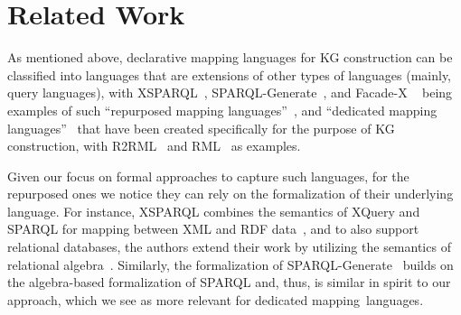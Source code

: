 \vspace{-2mm} %
\enlargethispage{\baselineskip}%

\section{Related Work}%
\label{sec:related_works}

\vspace{-2mm} %

As mentioned above, declarative mapping languages for KG construction can be classified into languages that are extensions of other types of languages (mainly, query languages), with XSPARQL~\cite{Bischof:2012:XSPARQL}, SPARQL-Generate~\cite{lefrancois_eswc_2017}, and
	Facade-X%
~\cite{Daga2021FacadeXOpinionated} being examples of such ``repurposed mapping languages''~\cite{VanAssche2022DeclarativeRDFgraph}, and ``dedicated mapping languages''~\cite{VanAssche2022DeclarativeRDFgraph} that have been created specifically for the purpose of KG construction, with R2RML~\cite{Seema2012R2RML} and RML~\cite{dimou_ldow_2014} as examples.


Given our focus on formal approaches to capture such languages, for the repurposed ones we notice
they can rely on the formalization of their underlying language.
	For instance,
XSPARQL combines the semantics of XQuery and SPARQL for mapping between XML and RDF data~\cite{Bischof:2012:XSPARQL}, and to also support
	relational databases,
the authors extend their work by utilizing the semantics of relational algebra~\cite{Lopes2011XSPARQL}. Similarly, the formalization of SPARQL-Generate~\cite{lefrancois_eswc_2017} builds on the algebra-based formalization of SPARQL and, thus, is similar in spirit to
	our approach,
which
	we see as more relevant for
dedicated mapping~languages.

